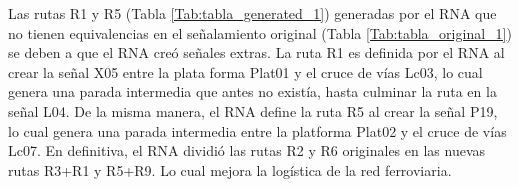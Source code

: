     Las rutas R1 y R5 (Tabla \ref{Tab:tabla_generated_1}) generadas por el RNA que no tienen equivalencias en el señalamiento original (Tabla \ref{Tab:tabla_original_1}) se deben a que el RNA creó señales extras. La ruta R1 es definida por el RNA al crear la señal X05 entre la plata forma Plat01 y el cruce de vías Lc03, lo cual genera una parada intermedia que antes no existía, hasta culminar la ruta en la señal L04. De la misma manera, el RNA define la ruta R5 al crear la señal P19, lo cual genera una parada intermedia entre la platforma Plat02 y el cruce de vías Lc07. En definitiva, el RNA dividió las rutas R2 y R6 originales en las nuevas rutas R3+R1 y R5+R9. Lo cual mejora la logística de la red ferroviaria.